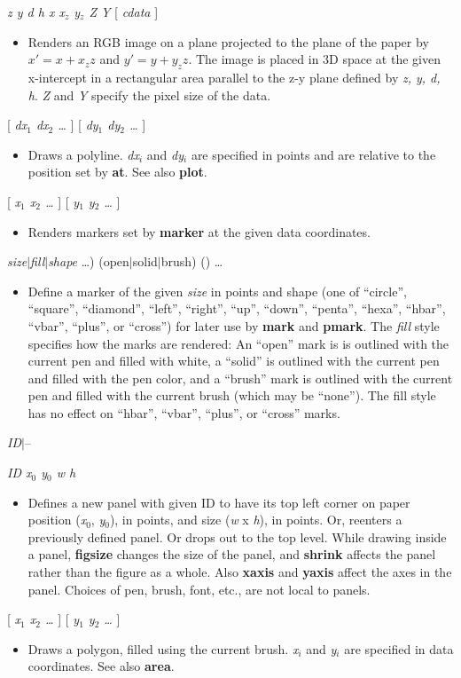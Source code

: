 \documentclass[11pt]{article}
\def\cmd#1#2{\noindent {\bf #1} #2\par}
\def\expl#1{\kern-8pt\begin{itemize}\item[]#1\end{itemize}}
\def\cref#1{{\bf #1}}
\def\bar{{$|$}}
\begin{document}
\cmd{zyimage}{\emph{z y d h x x$_z$ y$_z$ Z Y} [ \emph{cdata} ]}
\expl{Renders an RGB image on a plane projected to the plane of
  the paper by $x' = x + x_z z$ and $y' = y + y_z z$. The image is
  placed in 3D space at the given x-intercept in a rectangular area
  parallel to the z-y plane defined by \emph{z, y, d, h}. \emph{Z} and
  \emph{Y} specify the pixel size of the data.} 


\cmd{line}{[ \emph{dx$_1$ dx$_2$ \ldots} ] [ \emph{dy$_1$ dy$_2$ \ldots} ]}
\expl{Draws a polyline. \emph{dx$_i$} and \emph{dy$_i$} are specified in
  points and are relative to the position set by \cref{at}. See also
  \cref{plot}.}

\cmd{mark}{[ \emph{x$_1$ x$_2$ \ldots} ] [ \emph{y$_1$ y$_2$ \ldots} ]}
\expl{Renders markers set by \cref{marker} at the given data
  coordinates.}

\cmd{marker}{\emph{size}\bar\emph{fill}\bar\emph{shape} \ldots) (open\bar{}solid\bar{}brush)
  ()
  \ldots}
\expl{Define a marker of the given \emph{size} in points and shape
  (one of
  ``circle'', ``square'', ``diamond'', ``left'', ``right'', ``up'',
  ``down'', ``penta'', ``hexa'', ``hbar'', ``vbar'', ``plus'', or ``cross'')
  for
  later use by \cref{mark} and \cref{pmark}. The \emph{fill} style
  specifies how the marks are rendered: An ``open'' mark  is 
  is outlined with the current pen and filled with white,  a ``solid'' is
  outlined with the current pen and filled with the pen color, and a  ``brush'' mark is outlined  with
  the current pen and filled with the current brush (which may be ``none''). The fill style
  has no effect on ``hbar'', ``vbar'', ``plus'', or ``cross'' marks.}

\cmd{panel}{\emph{ID}\bar--}
\cmd{panel}{\emph{ID x$_0$ y$_0$ w h}}
\expl{Defines a new panel with given ID to have its top left corner on
  paper position (\emph{x$_0$}, \emph{y$_0$}), in points, and size
  (\emph{w} x \emph{h}), in points. Or, reenters a previously defined
  panel. Or drops out to the top level. While drawing inside a panel,
  \cref{figsize} changes the size of the panel, and \cref{shrink}
  affects the panel rather than the figure as a whole. Also
  \cref{xaxis} and \cref{yaxis} affect the axes in the
  panel. Choices of pen, brush, font, etc., are not local to panels.}

\cmd{patch}{[ \emph{x$_1$ x$_2$ \ldots} ] [ \emph{y$_1$ y$_2$ \ldots} ]}
\expl{Draws a polygon, filled using the current brush. \emph{x$_i$}
  and \emph{y$_i$} are specified in data coordinates. See also \cref{area}.}
\end{document}
